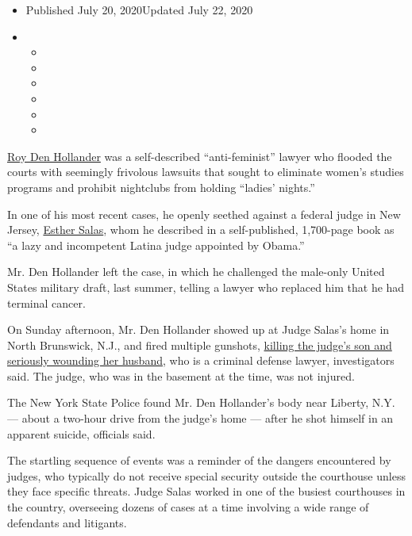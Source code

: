 \begin{itemize}
\item
  Published July 20, 2020Updated July 22, 2020
\item
  \begin{itemize}
  \item
  \item
  \item
  \item
  \item
  \item
  \end{itemize}
\end{itemize}

\href{https://www.nytimes3xbfgragh.onion/2020/07/22/nyregion/roy-hollander-esther-salas.html}{Roy
Den Hollander} was a self-described ``anti-feminist'' lawyer who flooded
the courts with seemingly frivolous lawsuits that sought to eliminate
women's studies programs and prohibit nightclubs from holding ``ladies'
nights.''

In one of his most recent cases, he openly seethed against a federal
judge in New Jersey,
\href{https://www.nytimes3xbfgragh.onion/2020/07/25/nyregion/roy-den-hollander-esther-salas-list.html}{Esther
Salas}, whom he described in a self-published, 1,700-page book as ``a
lazy and incompetent Latina judge appointed by Obama.''

Mr. Den Hollander left the case, in which he challenged the male-only
United States military draft, last summer, telling a lawyer who replaced
him that he had terminal cancer.

On Sunday afternoon, Mr. Den Hollander showed up at Judge Salas's home
in North Brunswick, N.J., and fired multiple gunshots,
\href{https://www.nytimes3xbfgragh.onion/2020/07/19/nyregion/shooting-nj-judge-esther-salas.html}{killing
the judge's son and seriously wounding her husband}, who is a criminal
defense lawyer, investigators said. The judge, who was in the basement
at the time, was not injured.

The New York State Police found Mr. Den Hollander's body near Liberty,
N.Y. --- about a two-hour drive from the judge's home --- after he shot
himself in an apparent suicide, officials said.

The startling sequence of events was a reminder of the dangers
encountered by judges, who typically do not receive special security
outside the courthouse unless they face specific threats. Judge Salas
worked in one of the busiest courthouses in the country, overseeing
dozens of cases at a time involving a wide range of defendants and
litigants.

